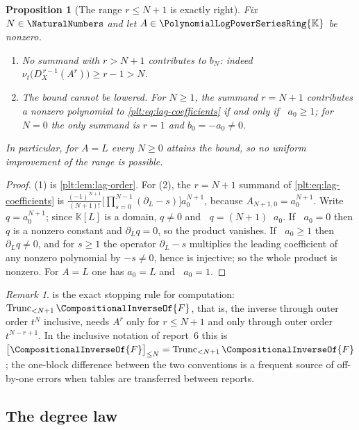 \documentclass[11pt,oneside]{article}
\theoremstyle{plain}
\newtheorem{proposition}[theorem]{Proposition}
\theoremstyle{definition}
\theoremstyle{remark}
\newtheorem{remark}[theorem]{Remark}
\newcommand{\K}{\mathbb{K}}
\newcommand{\PLpow}{\PolynomialLogPowerSeriesRing{\K}}   %
\newcommand{\ordt}{\nu_{t}}                              %
\DeclareMathOperator{\degL}{deg_{L}}
\newcommand{\Trunc}[2]{\operatorname{Trunc}_{<#2}#1}     %
\newcommand{\DX}{D_{X}}                                  %
\newcommand{\rev}[1]{\CompositionalInverseOf{#1}}
\begin{document}
\begin{proposition}[The range \(r\le N+1\) is exactly right]
\label{plt:prop:lag-range}
Fix \(N\in\NaturalNumbers\) and let \(A\in\PLpow\) be nonzero.
\begin{enumerate}
\item No summand with \(r>N+1\) contributes to \(b_N\): indeed
      \(\ordt\bigl(\DX^{\,r-1}(A^r)\bigr)\ge r-1>N\).
\item The bound cannot be lowered.  For \(N\ge1\), the summand \(r=N+1\)
      contributes a nonzero polynomial to \cref{plt:eq:lag-coefficients} if and
      only if \(\degL a_0\ge1\); for \(N=0\) the only summand is \(r=1\) and
      \(b_0=-a_0\ne0\).
\end{enumerate}
In particular, for \(A=L\) every \(N\ge0\) attains the bound, so no uniform
improvement of the range is possible.
\end{proposition}

\begin{proof}
(1) is \cref{plt:lem:lag-order}.  For (2), the \(r=N+1\) summand of
\cref{plt:eq:lag-coefficients} is
\(\frac{(-1)^{N+1}}{(N+1)!}\bigl[\prod_{s=0}^{N-1}(\partial_L-s)\bigr]a_0^{N+1}\),
because \(A_{N+1,0}=a_0^{N+1}\).  Write \(q=a_0^{N+1}\); since \(\K[L]\) is a
domain, \(q\ne0\) and \(\degL q=(N+1)\degL a_0\).  If \(\degL a_0=0\) then
\(q\) is a nonzero constant and \(\partial_Lq=0\), so the product vanishes.  If
\(\degL a_0\ge1\) then \(\partial_Lq\ne0\), and for \(s\ge1\) the operator
\(\partial_L-s\) multiplies the leading coefficient of any nonzero polynomial by
\(-s\ne0\), hence is injective; so the whole product is nonzero.  For
\(A=L\) one has \(a_0=L\) and \(\degL a_0=1\).
\end{proof}

\begin{remark}
\label{plt:rmk:lag-truncation-transfer}
 is the exact stopping rule for computation:
\(\Trunc{\rev{F}}{N+1}\), that is, the inverse through outer order \(t^{N}\)
inclusive, needs \(A^r\) only for \(r\le N+1\) and only through outer order
\(t^{N-r+1}\).  In the inclusive notation of report~6 this is
\(\bigl[\rev{F}\bigr]_{\le N}=\Trunc{\rev{F}}{N+1}\); the one-block difference
between the two conventions is a frequent source of off-by-one errors when
tables are transferred between reports.
\end{remark}

\subsection{The degree law}
\label{plt:sec:lag-degree}
\end{document}

